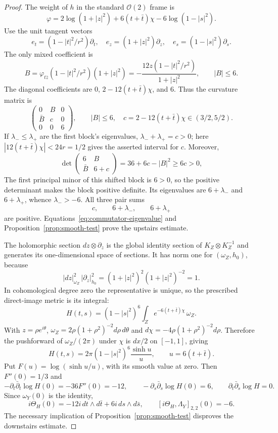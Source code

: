 \documentclass[11pt,reqno]{amsart}
\numberwithin{equation}{section}
\theoremstyle{definition}
\theoremstyle{remark}
\newcommand{\OO}{\mathcal O}
\begin{document}
\begin{proof}
The weight of $h$ in the standard $\OO(2)$ frame is
\[
 \varphi=2\log(1+|z|^2)+6(t+\bar t)\chi-6\log(1-|s|^2).
\]
Use the unit tangent vectors
\[
 e_t=(1-|t|^2/r^2)\partial_t,\quad
 e_z=(1+|z|^2)\partial_z,\quad
 e_s=(1-|s|^2)\partial_s.
\]
The only mixed coefficient is
\[
 B=\varphi_{t\bar z}(1-|t|^2/r^2)(1+|z|^2)
   =-\frac{12z(1-|t|^2/r^2)}{1+|z|^2},\qquad |B|\le6.
\]
The diagonal coefficients are $0$, $2-12(t+\bar t)\chi$, and $6$.
Thus the curvature matrix is
\begin{equation}\label{eq:counter-matrix}
 \begin{pmatrix}0&B&0\\\bar B&c&0\\0&0&6\end{pmatrix},
 \qquad |B|\le6,\quad c=2-12(t+\bar t)\chi\in(3/2,5/2).
\end{equation}
If $\lambda_-\le\lambda_+$ are the first block's eigenvalues,
$\lambda_-+\lambda_+=c>0$; here
$|12(t+\bar t)\chi|<24r=1/2$ gives the asserted interval for $c$.
Moreover,
\[
 \det\begin{pmatrix}6&B\\\bar B&6+c\end{pmatrix}
       =36+6c-|B|^2\ge6c>0,
\]
The first principal minor of this shifted block is $6>0$, so the
positive determinant makes the block positive definite.  Its
eigenvalues are $6+\lambda_-$ and $6+\lambda_+$, whence
$\lambda_->-6$.  All three pair sums
\begin{equation}\label{eq:positive-pairs}
 c,\qquad6+\lambda_-,\qquad6+\lambda_+
\end{equation}
are positive.  Equations~\eqref{eq:commutator-eigenvalue} and
Proposition~\ref{prop:smooth-test} prove the upstairs estimate.

The holomorphic section $dz\otimes\partial_z$ is the global identity
section of $K_Z\otimes K_Z^{-1}$ and generates its one-dimensional
space of sections.  It has norm one for $(\omega_Z,h_0)$, because
\[
 |dz|_{\omega_Z}^2\,|\partial_z|_{h_0}^2
       =(1+|z|^2)^2(1+|z|^2)^{-2}=1.
\]
In cohomological degree zero the representative is unique, so the
prescribed direct-image metric is its integral:
\[
 H(t,s)=(1-|s|^2)^6\int_Ze^{-6(t+\bar t)\chi}\,\omega_Z.
\]
With $z=\rho e^{i\theta}$,
$\omega_Z=2\rho(1+\rho^2)^{-2}d\rho\,d\theta$ and
$d\chi=-4\rho(1+\rho^2)^{-2}d\rho$.  Therefore the pushforward
of $\omega_Z/(2\pi)$ under $\chi$ is $dx/2$ on $[-1,1]$, giving
\begin{equation}\label{eq:explicit-H}
 H(t,s)=2\pi(1-|s|^2)^6\frac{\sinh u}{u},
 \qquad u=6(t+\bar t).
\end{equation}
Put $F(u)=\log(\sinh u/u)$, with its smooth value at zero.
Then $F''(0)=1/3$ and
\[
 -\partial_t\bar\partial_t\log H(0)=-36F''(0)=-12,\qquad
 -\partial_s\bar\partial_s\log H(0)=6,
 \qquad\partial_t\bar\partial_s\log H=0.
\]
Since $\omega_Y(0)$ is the identity,
\begin{equation}\label{eq:negative-trace}
 i\Theta_H(0)=-12i\,dt\wedge d\bar t+6i\,ds\wedge d\bar s,
 \qquad[i\Theta_H,\Lambda_Y]_{2,2}(0)=-6.
\end{equation}
The necessary implication of Proposition~\ref{prop:smooth-test}
disproves the downstairs estimate.
\end{proof}
\end{document}
